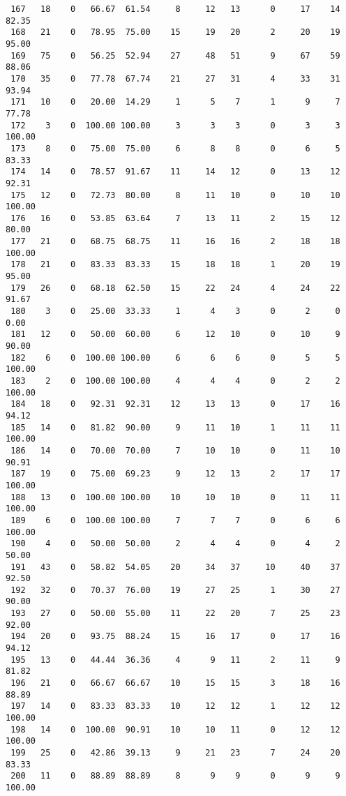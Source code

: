 \begin{verbatim}
 167   18    0   66.67  61.54     8     12   13      0     17    14    82.35
 168   21    0   78.95  75.00    15     19   20      2     20    19    95.00
 169   75    0   56.25  52.94    27     48   51      9     67    59    88.06
 170   35    0   77.78  67.74    21     27   31      4     33    31    93.94
 171   10    0   20.00  14.29     1      5    7      1      9     7    77.78
 172    3    0  100.00 100.00     3      3    3      0      3     3   100.00
 173    8    0   75.00  75.00     6      8    8      0      6     5    83.33
 174   14    0   78.57  91.67    11     14   12      0     13    12    92.31
 175   12    0   72.73  80.00     8     11   10      0     10    10   100.00
 176   16    0   53.85  63.64     7     13   11      2     15    12    80.00
 177   21    0   68.75  68.75    11     16   16      2     18    18   100.00
 178   21    0   83.33  83.33    15     18   18      1     20    19    95.00
 179   26    0   68.18  62.50    15     22   24      4     24    22    91.67
 180    3    0   25.00  33.33     1      4    3      0      2     0     0.00
 181   12    0   50.00  60.00     6     12   10      0     10     9    90.00
 182    6    0  100.00 100.00     6      6    6      0      5     5   100.00
 183    2    0  100.00 100.00     4      4    4      0      2     2   100.00
 184   18    0   92.31  92.31    12     13   13      0     17    16    94.12
 185   14    0   81.82  90.00     9     11   10      1     11    11   100.00
 186   14    0   70.00  70.00     7     10   10      0     11    10    90.91
 187   19    0   75.00  69.23     9     12   13      2     17    17   100.00
 188   13    0  100.00 100.00    10     10   10      0     11    11   100.00
 189    6    0  100.00 100.00     7      7    7      0      6     6   100.00
 190    4    0   50.00  50.00     2      4    4      0      4     2    50.00
 191   43    0   58.82  54.05    20     34   37     10     40    37    92.50
 192   32    0   70.37  76.00    19     27   25      1     30    27    90.00
 193   27    0   50.00  55.00    11     22   20      7     25    23    92.00
 194   20    0   93.75  88.24    15     16   17      0     17    16    94.12
 195   13    0   44.44  36.36     4      9   11      2     11     9    81.82
 196   21    0   66.67  66.67    10     15   15      3     18    16    88.89
 197   14    0   83.33  83.33    10     12   12      1     12    12   100.00
 198   14    0  100.00  90.91    10     10   11      0     12    12   100.00
 199   25    0   42.86  39.13     9     21   23      7     24    20    83.33
 200   11    0   88.89  88.89     8      9    9      0      9     9   100.00

\end{verbatim}
